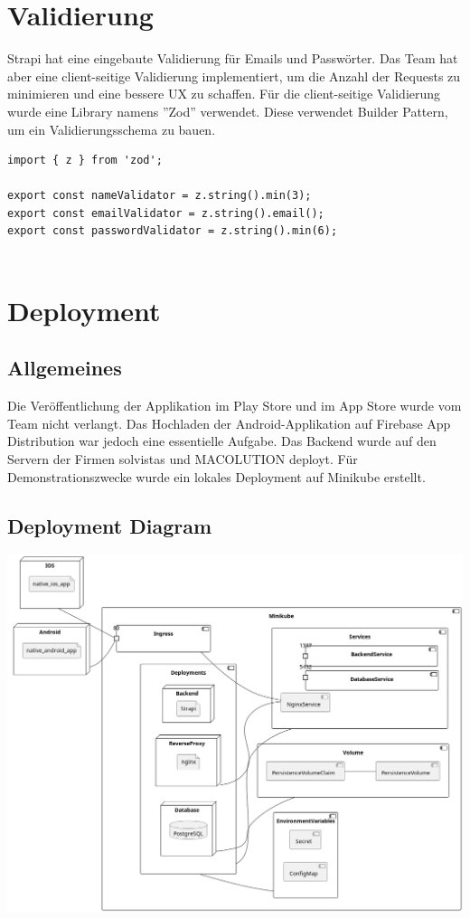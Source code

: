 \section{Validierung}
Strapi hat eine eingebaute Validierung für Emails und Passwörter. Das Team hat aber eine client-seitige Validierung implementiert, um die Anzahl der Requests zu minimieren und eine bessere UX zu schaffen.
Für die client-seitige Validierung wurde eine Library namens ''Zod'' verwendet. Diese verwendet Builder Pattern, um ein Validierungsschema zu bauen.
\begin{lstlisting}[caption=Validierungsschemen]
 import { z } from 'zod';

export const nameValidator = z.string().min(3);
export const emailValidator = z.string().email();
export const passwordValidator = z.string().min(6);
  
\end{lstlisting}


\section{Deployment}

\subsection{Allgemeines}

Die Veröffentlichung der Applikation im Play Store und im App Store wurde vom Team nicht verlangt.
Das Hochladen der Android-Applikation auf Firebase App Distribution war jedoch eine essentielle Aufgabe.
Das Backend wurde auf den Servern der Firmen solvistas und MACOLUTION deployt. Für Demonstrationszwecke wurde ein lokales Deployment auf Minikube erstellt.


\subsection{Deployment Diagram}
\begin{center}
  \includegraphics[width=\textwidth]{pics/dev-deployment.png}
\end{center}
